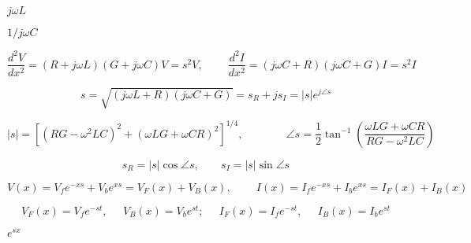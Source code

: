 {\newpage\clearpage
{}%
$j\omega L$%
\lthtmlinlinemathZ
\lthtmlcheckvsize\clearpage}

{\newpage\clearpage
{}%
$1/j\omega C$%
\lthtmlinlinemathZ
\lthtmlcheckvsize\clearpage}

{\newpage\clearpage
{}%
\begin{displaymath} \frac{d^2V}{dx^2}=(R+j\omega L)(G+j\omega C)V=s^2V,
\;\;\;\;\;\;\;\;
\frac{d^2I}{dx^2}=(j\omega C+R)(j\omega C+G)I=s^2I \end{displaymath}%
\lthtmldisplayZ
\lthtmlcheckvsize\clearpage}

{\newpage\clearpage
{}%
\begin{displaymath} s=\sqrt{(j\omega L+R)(j\omega C+G)}=s_R+js_I=|s| e^{j\angle s} \end{displaymath}%
\lthtmldisplayZ
\lthtmlcheckvsize\clearpage}

{\newpage\clearpage
{}%
\begin{displaymath} |s|=\left[ (RG-\omega^2LC)^2+(\omega LG+\omega CR)^2\right]^{1/4},
\;\;\;\;\;\;\;\;\;\;\;\;\;\;
\angle s=\frac{1}{2}\tan^{-1}\left(\frac{\omega LG+\omega CR}{RG-\omega^2LC}\right)\end{displaymath}%
\lthtmldisplayZ
\lthtmlcheckvsize\clearpage}

{\newpage\clearpage
{}%
\begin{displaymath} s_R=|s|\cos\angle s,\;\;\;\;\;\;\;s_I=|s|\sin\angle s \end{displaymath}%
\lthtmldisplayZ
\lthtmlcheckvsize\clearpage}

{\newpage\clearpage
{}%
\begin{displaymath} V(x)=V_f e^{-xs}+V_b e^{xs}=V_F(x)+V_B(x),
\;\;\;\;\;\;\;\; I(x)=I_f e^{-xs}+I_b e^{xs}=I_F(x)+I_B(x) \end{displaymath}%
\lthtmldisplayZ
\lthtmlcheckvsize\clearpage}

{\newpage\clearpage
{}%
\begin{displaymath} V_F(x)=V_f e^{-st},\;\;\;\;\;V_B(x)=V_b e^{st};\;\;\;\;\;
I_F(x)=I_f e^{-st},\;\;\;\;\;I_B(x)=I_b e^{st} \end{displaymath}%
\lthtmldisplayZ
\lthtmlcheckvsize\clearpage}

{\newpage\clearpage
{}%
$e^{sx}$%
\lthtmlinlinemathZ
\lthtmlcheckvsize\clearpage}

